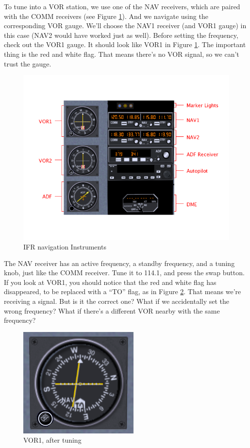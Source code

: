 
To tune into a VOR station, we use one of the NAV receivers, which are
paired with the COMM receivers (see Figure \ref{fig:panel}).  And we
navigate using the corresponding VOR gauge.  We'll choose the NAV1
receiver (and VOR1 gauge) in this case (NAV2 would have worked just as
well).  Before setting the frequency, check out the VOR1 gauge.  It
should look like VOR1 in Figure \ref{fig:panel}.  The important thing
is the red and white flag.  That means there's no VOR signal, so we
can't trust the gauge.

\begin{figure}
  \begin{center}
    \includegraphics[width=12cm]{img/panel_labelled.png}
    \caption{IFR navigation Instruments}
    \label{fig:panel}
  \end{center}
\end{figure}

The NAV receiver has an active frequency, a standby frequency, and a
tuning knob, just like the COMM receiver.  Tune it to 114.1, and press
the swap button.  If you look at VOR1, you should notice that the red
and white flag has disappeared, to be replaced with a ``TO'' flag, as
in Figure \ref{fig:VOR1}.  That means we're receiving a signal.  But
is it the correct one?  What if we accidentally set the wrong
frequency?  What if there's a different VOR nearby with the same
frequency?

\begin{figure}
  \begin{center}
    \includegraphics[width=6cm]{img/VOR1.png}
    \caption{VOR1, after tuning}
    \label{fig:VOR1}
  \end{center}
\end{figure}

